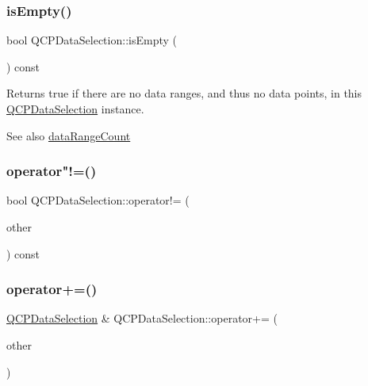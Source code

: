 \subsubsection{\texorpdfstring{is\+Empty()}{isEmpty()}}
{\footnotesize\ttfamily bool Q\+C\+P\+Data\+Selection\+::is\+Empty (\begin{DoxyParamCaption}{ }\end{DoxyParamCaption}) const\hspace{0.3cm}{\ttfamily [inline]}}

Returns true if there are no data ranges, and thus no data points, in this \hyperlink{class_q_c_p_data_selection}{Q\+C\+P\+Data\+Selection} instance.

\begin{DoxySeeAlso}{See also}
\hyperlink{class_q_c_p_data_selection_abd8869ccb231ab991e8576de931f647d}{data\+Range\+Count} 
\end{DoxySeeAlso}
\mbox{\label{class_q_c_p_data_selection_a8324733cc88660ee4792ee60d6a4520c}} 
\subsubsection{\texorpdfstring{operator"!=()}{operator!=()}}
{\footnotesize\ttfamily bool Q\+C\+P\+Data\+Selection\+::operator!= (\begin{DoxyParamCaption}\item[{const \hyperlink{class_q_c_p_data_selection}{Q\+C\+P\+Data\+Selection} \&}]{other }\end{DoxyParamCaption}) const\hspace{0.3cm}{\ttfamily [inline]}}

\mbox{\label{class_q_c_p_data_selection_a4584d4b0ea5c4f095bd7b70f88eb5d9d}} 
\subsubsection{\texorpdfstring{operator+=()}{operator+=()}\hspace{0.1cm}{\footnotesize\ttfamily [1/2]}}
{\footnotesize\ttfamily \hyperlink{class_q_c_p_data_selection}{Q\+C\+P\+Data\+Selection} \& Q\+C\+P\+Data\+Selection\+::operator+= (\begin{DoxyParamCaption}\item[{const \hyperlink{class_q_c_p_data_selection}{Q\+C\+P\+Data\+Selection} \&}]{other }\end{DoxyParamCaption})}

